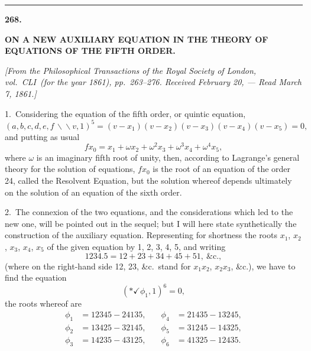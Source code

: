 \documentclass[11pt,a4paper]{article}
\theoremstyle{plain}
\theoremstyle{definition}
\theoremstyle{remark}
\begin{document}
\newpage
\begin{center}
\rule{0.5\textwidth}{0.4pt}
\end{center}


\newpage
\setcounter{page}{321}
\begin{center}
\textbf{268.}\par
\smallskip
\textbf{ON A NEW AUXILIARY EQUATION IN THE THEORY OF EQUATIONS OF THE FIFTH ORDER.}\par
\smallskip
\textit{[From the \textit{Philosophical Transactions} of the Royal Society of London, vol.~CLI\ (for the year 1861), pp.~263--276. Received February 20, --- Read March 7, 1861.]}
\end{center}

\smallskip

1.\ Considering the equation of the fifth order, or quintic equation,
\[
(a,b,c,d,e,f\,\backslash\!\!\backslash v,1)^5 = (v-x_1)(v-x_2)(v-x_3)(v-x_4)(v-x_5) = 0,
\]
and putting as usual
\[
fx_0 = x_1 + \omega x_2 + \omega^2 x_3 + \omega^3 x_4 + \omega^4 x_5,
\]
where $\omega$ is an imaginary fifth root of unity, then, according to Lagrange's general theory for the solution of equations, $fx_0$ is the root of an equation of the order 24, called the Resolvent Equation, but the solution whereof depends ultimately on the solution of an equation of the sixth order.

2.\ The connexion of the two equations, and the considerations which led to the new one, will be pointed out in the sequel; but I will here state synthetically the construction of the auxiliary equation. Representing for shortness the roots $x_1$, $x_2$, $x_3$, $x_4$, $x_5$ of the given equation by 1, 2, 3, 4, 5, and writing
\[
1234.5 = 12+23+34+45+51,\ \text{\&c.},
\]
(where on the right-hand side 12, 23, \&c.\ stand for $x_1x_2$, $x_2x_3$, \&c.), we have to find the equation
\[
(*\checkmark\phi_1, 1)^6 = 0,
\]
the roots whereof are
\begin{align*}
\phi_1 &= 12345-24135,\quad &\phi_4 &= 21435-13245,\\
\phi_2 &= 13425-32145,\quad &\phi_5 &= 31245-14325,\\
\phi_3 &= 14235-43125,\quad &\phi_6 &= 41325-12435.
\end{align*}
\end{document}
